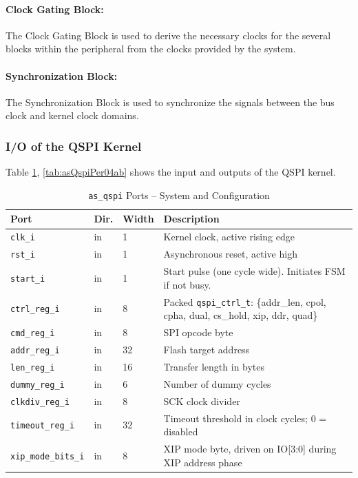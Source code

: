 \paragraph{Clock Gating Block: } The Clock Gating Block is used to derive the necessary clocks for the several blocks within the peripheral from the clocks provided by the system.

\paragraph{Synchronization Block: } The Synchronization Block is used to synchronize the signals between the bus clock and kernel clock domains.

\subsubsection{I/O of the QSPI Kernel}

Table \ref{tab:asQspiPer04a}, \ref{tab:asQspiPer04ab}  shows the input and outputs of the QSPI kernel.

\begin{table}[H]
\caption{\texttt{as\_qspi} Ports -- System and Configuration}
\label{tab:asQspiPer04a}
\centering
\begin{tabularx}{\textwidth}{|l|l|l|X|}
  \hline
  Port & Dir. & Width & Description \\
  \hline\hline
  \texttt{clk\_i}           & in  & 1  & Kernel clock, active rising edge \\
  \hline
  \texttt{rst\_i}           & in  & 1  & Asynchronous reset, active high \\
  \hline
  \texttt{start\_i}         & in  & 1  & Start pulse (one cycle wide). Initiates FSM if not busy. \\
  \hline
  \texttt{ctrl\_reg\_i}     & in  & 8  & Packed \texttt{qspi\_ctrl\_t}: \{addr\_len, cpol, cpha, dual, cs\_hold, xip, ddr, quad\} \\
  \hline
  \texttt{cmd\_reg\_i}      & in  & 8  & SPI opcode byte \\
  \hline
  \texttt{addr\_reg\_i}     & in  & 32 & Flash target address \\
  \hline
  \texttt{len\_reg\_i}      & in  & 16 & Transfer length in bytes \\
  \hline
  \texttt{dummy\_reg\_i}    & in  & 6  & Number of dummy cycles \\
  \hline
  \texttt{clkdiv\_reg\_i}   & in  & 8  & SCK clock divider \\
  \hline
  \texttt{timeout\_reg\_i}  & in  & 32 & Timeout threshold in clock cycles; 0 = disabled \\
  \hline
  \texttt{xip\_mode\_bits\_i}& in & 8  & XIP mode byte, driven on IO[3:0] during XIP address phase \\
  \hline
\end{tabularx}
\end{table}


